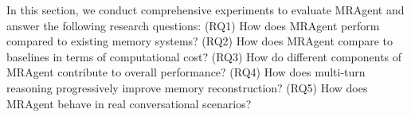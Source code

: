 


In this section, we conduct comprehensive experiments to evaluate MRAgent and answer the following research questions:
(RQ1) How does MRAgent perform compared to existing memory systems?
(RQ2) How does MRAgent compare to baselines in terms of computational cost?
(RQ3) How do different components of MRAgent contribute to overall performance?
(RQ4) How does multi-turn reasoning progressively improve memory reconstruction?
(RQ5) How does MRAgent behave in real conversational scenarios?

